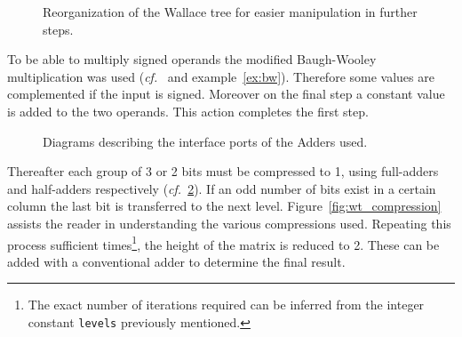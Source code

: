 \begin{figure}[H]
\centering
{}\qquad
{}
\caption{Reorganization of the Wallace tree for easier manipulation in further steps.}
\label{fig:wt_reorganization}
\end{figure}

To be able to multiply signed operands the modified Baugh-Wooley multiplication was used (\emph{cf.}~\cite{part3} and example~\ref{ex:bw}). Therefore some values are complemented if the input is signed. Moreover on the final step a constant value is added to the two operands.
This action completes the first step.

\begin{figure}[H]
\centering
{}
\caption{Diagrams describing the interface ports of the Adders used.}
\label{fig:adders_dia}
\end{figure}




Thereafter each group of 3 or 2 bits must be compressed to 1, using full-adders and half-adders respectively (\emph{cf.}~\ref{fig:adders_dia}). If an odd number of bits exist in a certain column the last bit is transferred to the next level. Figure~\ref{fig:wt_compression} assists the reader in understanding the various compressions used. Repeating this process sufficient times\footnote{The exact number of iterations required can be inferred from the integer constant \texttt{levels} previously mentioned.}, the height of the matrix is reduced to 2. These can be added with a conventional adder to determine the final result.

